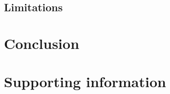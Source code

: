 \documentclass[10pt,letterpaper]{article}
\begin{document}
\subsection{Limitations}
\section*{Conclusion}



\section*{Supporting information}


\end{document}
